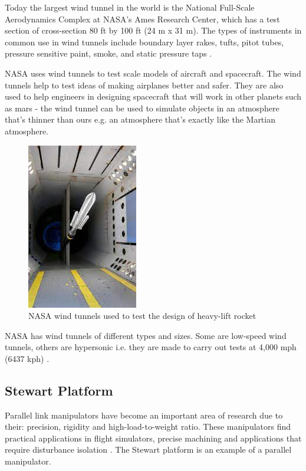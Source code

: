 Today the largest wind tunnel in the world is the National Full-Scale Aerodynamics Complex at NASA's Ames Research Center, which has a test section of cross-section 80 ft by 100 ft (24 m x 31 m). The types of instruments in common use in wind tunnels include boundary layer rakes, tufts, pitot tubes, pressure sensitive paint, smoke, and static pressure taps \cite{morris_force_2010}.

NASA uses wind tunnels to test scale models of aircraft and spacecraft. The wind tunnels help to test ideas of making airplanes better and safer. They are also used to help engineers in designing spacecraft that will work in other planets such as mars - the wind tunnel can be used to simulate objects in an atmosphere that's thinner than ours e.g. an atmosphere that's exactly like the Martian atmosphere. 
\begin{center}
    \begin{figure}[H]
\centering
\includegraphics{Figures/Fig4}
\caption[NASA Wind tunnel - space application]{NASA wind tunnels used to test the design of heavy-lift rocket \cite{NASA}}
\end{figure}
\end{center}
NASA has wind tunnels of different types and sizes. Some are low-speed wind tunnels, others are hypersonic i.e. they are made to carry out tests at 4,000 mph (6437 kph) \cite{NASA}.
\subsection{Stewart Platform}
Parallel link manipulators have become an important area of research due to their: precision, rigidity and high-load-to-weight ratio. These manipulators find practical applications in flight simulators, precise machining and applications that require disturbance isolation \cite{iqbal_dynamic_2008}. The Stewart platform is an example of a parallel manipulator.

